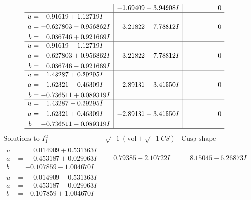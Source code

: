 \documentclass[1p]{elsarticle_modified}
\theoremstyle{definition}
\newcommand{\I}{\sqrt{-1}}
\begin{document}
$$\begin{array}{c|c|c}
 & -1.69409 + 3.94908 I & \phantom{-0.000000 } 0 \\ \hline\begin{aligned}
u &= -0.91619 + 1.12719 I \\
a &= -0.627803 - 0.956862 I \\
b &= \phantom{-}0.036746 + 0.921669 I\end{aligned}
 & \phantom{-}3.21822 - 7.78812 I & \phantom{-0.000000 } 0 \\ \hline\begin{aligned}
u &= -0.91619 - 1.12719 I \\
a &= -0.627803 + 0.956862 I \\
b &= \phantom{-}0.036746 - 0.921669 I\end{aligned}
 & \phantom{-}3.21822 + 7.78812 I & \phantom{-0.000000 } 0 \\ \hline\begin{aligned}
u &= \phantom{-}1.43287 + 0.29295 I \\
a &= -1.62321 - 0.46309 I \\
b &= -0.736511 + 0.089319 I\end{aligned}
 & -2.89131 - 3.41550 I & \phantom{-0.000000 } 0 \\ \hline\begin{aligned}
u &= \phantom{-}1.43287 - 0.29295 I \\
a &= -1.62321 + 0.46309 I \\
b &= -0.736511 - 0.089319 I\end{aligned}
 & -2.89131 + 3.41550 I & \phantom{-0.000000 } 0\\
 \hline 
 \end{array}$$\newpage$$\begin{array}{c|c|c}  
\text{Solutions to }I^u_{1}& \I (\text{vol} + \sqrt{-1}CS) & \text{Cusp shape}\\
 \hline 
\begin{aligned}
u &= \phantom{-}0.014909 + 0.531363 I \\
a &= \phantom{-}0.453187 + 0.029063 I \\
b &= -0.107859 - 1.004670 I\end{aligned}
 & \phantom{-}0.79385 + 2.10722 I & \phantom{-}8.15045 - 5.26873 I \\ \hline\begin{aligned}
u &= \phantom{-}0.014909 - 0.531363 I \\
a &= \phantom{-}0.453187 - 0.029063 I \\
b &= -0.107859 + 1.004670 I\end{aligned}

\end{array}$$
\end{document}
